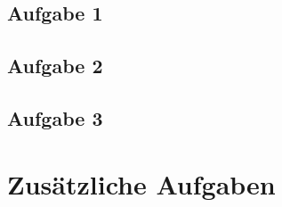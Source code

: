 \documentclass[a4paper]{article}
\begin{document}
\subsection{Aufgabe 1}
\textit{}

\subsection{Aufgabe 2}
\textit{}


\subsection{Aufgabe 3}
\textit{}




\newpage
\section{Zusätzliche Aufgaben}
\end{document}
